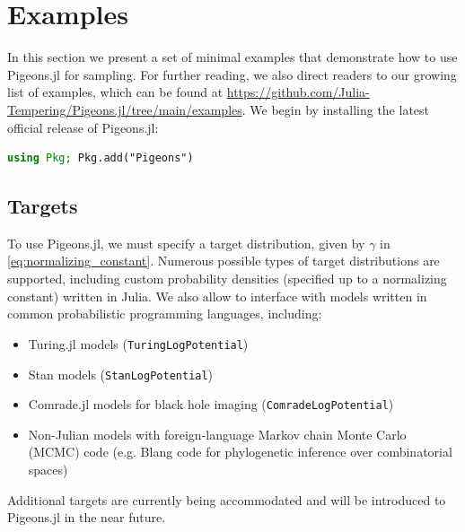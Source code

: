 \section{Examples}
In this section we present a set of minimal examples 
that demonstrate how to use Pigeons.jl for sampling. 
For further reading, we also direct readers to our growing list of examples, which can be found at 
\url{https://github.com/Julia-Tempering/Pigeons.jl/tree/main/examples}.
We begin by installing the latest official release of Pigeons.jl: 
\begin{lstlisting}[language = Julia]
using Pkg; Pkg.add("Pigeons")
\end{lstlisting}


\subsection{Targets}
To use Pigeons.jl, we must specify a target distribution, given by $\gamma$ 
in \cref{eq:normalizing_constant}.
Numerous possible types of target distributions are supported, including 
custom probability densities (specified up to a normalizing constant) written in Julia.
We also allow to interface with models written in common probabilistic programming 
languages, including:
\begin{itemize}
    \item Turing.jl \cite{ge2018turing} models (\texttt{TuringLogPotential})
    \item Stan \cite{carpenter2017stan} models (\texttt{StanLogPotential})
    \item Comrade.jl models for black hole imaging (\texttt{ComradeLogPotential})
    \item Non-Julian models with foreign-language Markov chain Monte Carlo (MCMC) code 
    (e.g. Blang \cite{bouchard2022blang} code for phylogenetic inference over combinatorial spaces) 
\end{itemize}
Additional targets are currently being accommodated and will be 
introduced to Pigeons.jl in the near future.

